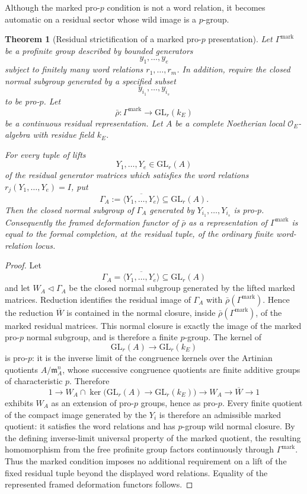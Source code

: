 \documentclass[11pt]{article}
\newtheorem{theorem}{Theorem}[section]
\theoremstyle{definition}
\begin{document}
Although the marked pro-$p$ condition is not a word relation, it becomes automatic on a residual sector whose wild image is a $p$-group.

\begin{theorem}[Residual strictification of a marked pro-$p$ presentation]\label{thm:marked-residual-strictification}
Let $\Gamma^{\mathrm{mark}}$ be a profinite group described by bounded generators
\[
 y_1,\ldots,y_e
\]
subject to finitely many word relations $r_1,\ldots,r_m$.  In addition, require the closed normal subgroup generated by a specified subset
\[
 y_{i_1},\ldots,y_{i_s}
\]
to be pro-$p$.  Let
\[
 \bar\rho:\Gamma^{\mathrm{mark}}\longrightarrow \mathrm{GL}_r(k_E)
\]
be a continuous residual representation.  Let $A$ be a complete Noetherian local $\mathcal O_E$-algebra with residue field $k_E$.

For every tuple of lifts
\[
 Y_1,\ldots,Y_e\in\mathrm{GL}_r(A)
\]
of the residual generator matrices which satisfies the word relations $r_j(Y_1,\ldots,Y_e)=I$, put
\[
 \Gamma_A:=\overline{\langle Y_1,\ldots,Y_e\rangle}
 \subseteq\mathrm{GL}_r(A).
\]
Then the closed normal subgroup of $\Gamma_A$ generated by $Y_{i_1},\ldots,Y_{i_s}$ is pro-$p$.  Consequently the framed deformation functor of $\bar\rho$ as a representation of $\Gamma^{\mathrm{mark}}$ is equal to the formal completion, at the residual tuple, of the ordinary finite word-relation locus.
\end{theorem}

\begin{proof}
Let
\[
 \Gamma_A=\overline{\langle Y_1,\ldots,Y_e\rangle}
 \subseteq\mathrm{GL}_r(A)
\]
and let $W_A\triangleleft\Gamma_A$ be the closed normal subgroup generated by the lifted marked matrices.  Reduction identifies the residual image of $\Gamma_A$ with $\bar\rho(\Gamma^{\mathrm{mark}})$.  Hence the reduction $\overline W$ is contained in the normal closure, inside $\bar\rho(\Gamma^{\mathrm{mark}})$, of the marked residual matrices.  This normal closure is exactly the image of the marked pro-$p$ normal subgroup, and is therefore a finite $p$-group.  The kernel of
\[
 \mathrm{GL}_r(A)\longrightarrow\mathrm{GL}_r(k_E)
\]
is pro-$p$: it is the inverse limit of the congruence kernels over the Artinian quotients $A/\mathfrak m_A^n$, whose successive congruence quotients are finite additive groups of characteristic $p$.  Therefore
\[
 1\longrightarrow
 W_A\cap\ker\bigl(\mathrm{GL}_r(A)\to\mathrm{GL}_r(k_E)\bigr)
 \longrightarrow W_A\longrightarrow\overline W\longrightarrow1
\]
exhibits $W_A$ as an extension of pro-$p$ groups, hence as pro-$p$.  Every finite quotient of the compact image generated by the $Y_i$ is therefore an admissible marked quotient: it satisfies the word relations and has $p$-group wild normal closure.  By the defining inverse-limit universal property of the marked quotient, the resulting homomorphism from the free profinite group factors continuously through $\Gamma^{\mathrm{mark}}$.  Thus the marked condition imposes no additional requirement on a lift of the fixed residual tuple beyond the displayed word relations.  Equality of the represented framed deformation functors follows.
\end{proof}
\end{document}
